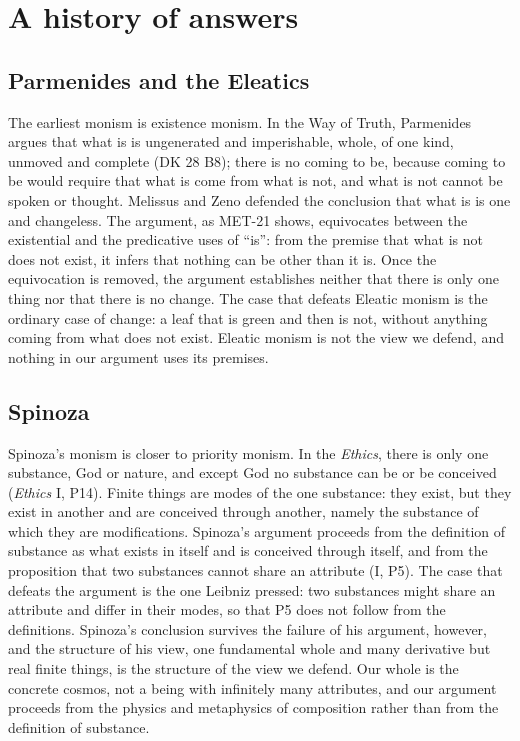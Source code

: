 \documentclass{situationist-preprint}
\begin{document}
\section{A history of answers}\label{s:history}

\subsection{Parmenides and the Eleatics}

The earliest monism is existence monism. In the Way of Truth, Parmenides argues that what is is ungenerated and imperishable, whole, of one kind, unmoved and complete (DK 28 B8); there is no coming to be, because coming to be would require that what is come from what is not, and what is not cannot be spoken or thought. Melissus and Zeno defended the conclusion that what is is one and changeless. The argument, as MET-21 shows, equivocates between the existential and the predicative uses of \enquote{is}: from the premise that what is not does not exist, it infers that nothing can be other than it is. Once the equivocation is removed, the argument establishes neither that there is only one thing nor that there is no change. The case that defeats Eleatic monism is the ordinary case of change: a leaf that is green and then is not, without anything coming from what does not exist. Eleatic monism is not the view we defend, and nothing in our argument uses its premises.

\subsection{Spinoza}

Spinoza's monism is closer to priority monism. In the \emph{Ethics}, there is only one substance, God or nature, and except God no substance can be or be conceived (\emph{Ethics} I, P14). Finite things are modes of the one substance: they exist, but they exist in another and are conceived through another, namely the substance of which they are modifications. Spinoza's argument proceeds from the definition of substance as what exists in itself and is conceived through itself, and from the proposition that two substances cannot share an attribute (I, P5). The case that defeats the argument is the one Leibniz pressed: two substances might share an attribute and differ in their modes, so that P5 does not follow from the definitions. Spinoza's conclusion survives the failure of his argument, however, and the structure of his view, one fundamental whole and many derivative but real finite things, is the structure of the view we defend. Our whole is the concrete cosmos, not a being with infinitely many attributes, and our argument proceeds from the physics and metaphysics of composition rather than from the definition of substance.
\end{document}
